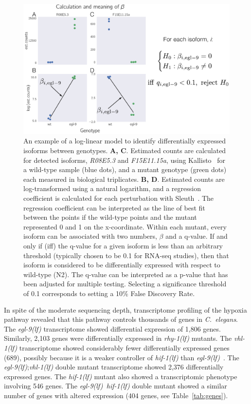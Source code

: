 \documentclass[10pt, onecolumn]{article}
\newcommand{\cel}{\emph{C.~elegans}}
\newcommand{\gene}[1]{\emph{#1}}
\newcommand{\egl}{\emph{\mbox{egl-9}(lf)}}
\newcommand{\rhy}{\emph{\mbox{rhy-1}(lf)}}
\newcommand{\vhl}{\emph{\mbox{vhl-1}(lf)}}
\newcommand{\eglhif}{\emph{\mbox{egl-9(lf)}~\mbox{hif-1(lf)}}}
\newcommand{\hif}{\emph{\mbox{hif-1(lf)}}}
\newcommand{\egln}{1,806}
\newcommand{\rhyn}{2,103}
\newcommand{\vhln}{689}
\newcommand{\eglvhln}{2,376}
\newcommand{\hifn}{546}
\newcommand{\eglhifn}{404}
\begin{document}
\begin{figure}[tbhp]
\centering
\includegraphics[width=\linewidth]{../figs/meaningofbeta.pdf}
\caption{
An example of a log-linear model to identify differentially expressed
isoforms between genotypes.
\textbf{A, C}. Estimated counts are calculated for
detected isoforms, \gene{R08E5.3} and \gene{F15E11.15a}, using
Kallisto~\cite{Bray2016} for a wild-type sample (blue dots), and a mutant genotype
(green dots) each measured in biological triplicates.
\textbf{B, D}. Estimated counts are log-transformed using a natural logarithm,
and a regression coefficient is calculated for each perturbation with
Sleuth~\cite{Pimentel2016}. The regression coefficient can be interpreted as the
line of best fit between the points if the wild-type points and the mutant
represented 0 and 1 on the x-coordinate. Within each mutant, every isoform can
be associated with two numbers, $\beta$ and a q-value. If and only if (iff) the
q-value for a given isoform is less than an arbitrary threshold (typically chosen
to be 0.1 for RNA-seq studies), then that isoform is considered to be
differentially expressed with respect to wild-type (N2). The q-value can be
interpreted as a p-value that has been adjusted for multiple testing. Selecting
a significance threshold of 0.1 corresponds to setting a 10\% False Discovery
Rate.
}
\label{fig:explain}
\end{figure}


In spite of the moderate sequencing depth, transcriptome profiling of the hypoxia
pathway revealed that this pathway controls thousands of genes in \cel{}. The
\egl{} transcriptome showed differential expression of \egln{} genes. Similarly,
\rhyn{} genes were differentially expressed in \rhy{} mutants. The \vhl{}
transcriptome showed considerably fewer differentially expressed genes (\vhln{}),
possibly because it is a weaker controller of \hif{} than
\egl{}~\cite{Shao2009}. The \egl{};\vhl{} double mutant transcriptome showed
\eglvhln{} differentially expressed genes. The \hif{} mutant also showed a
transcriptomic phenotype involving \hifn{} genes. The \eglhif{} double mutant
showed a similar number of genes with altered expression (\eglhifn{} genes, see
Table~\ref{tab:genes}).
\end{document}
